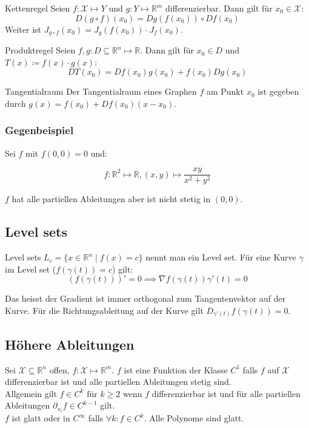 \documentclass[a4paper,10pt]{article}
\def\R{\mathbb{R}}
\def\X{\mathcal{X}}
\begin{document}
\begin{subbox}{Kettenregel}
  Seien $f: \mathcal{X} \mapsto Y$ und $g: Y \mapsto \R^m$ differenzierbar. Dann gilt für $x_0 \in \mathcal{X}$:
  $$D(g \circ f)(x_0) = Dg(f(x_0)) \circ Df(x_0)$$
  Weiter ist \(J_{g \circ f}(x_0) = J_g(f(x_0)) \cdot J_f(x_0)\).
\end{subbox}

\begin{subbox}{Produktregel}
  Seien $f, g: D \subseteq \R^n \mapsto \R$. Dann gilt für $x_0 \in D$ und $T(x) \coloneqq f(x) \cdot g(x)$:
  $$DT(x_0) = Df(x_0) g(x_0) + f(x_0) Dg(x_0)$$
\end{subbox}

\begin{subbox}{Tangentialraum}
  Der Tangentialraum eines Graphen \(f\) am Punkt \(x_0\) ist gegeben durch \(g(x) = f(x_0) + Df(x_0)(x-x_0)\).
\end{subbox}

\subsubsection*{Gegenbeispiel}

Sei $f$ mit $f(0, 0) = 0$ und:

$$f: \R^2 \mapsto \R, (x, y) \mapsto \frac{xy}{x^2 + y^2}$$

$f$ hat alle partiellen Ableitungen aber ist nicht stetig in $(0, 0)$.

\subsection{Level sets}

\begin{mainbox}{Level sets}
  $L_c = \{ x \in \mathbb{R}^n \mid f(x) = c \}$ nennt man ein Level set.
  Für eine Kurve $\gamma$ im Level set ($f(\gamma(t)) = c$) gilt:
  $$(f(\gamma(t)))' = 0 \implies \nabla f(\gamma(t)) \gamma'(t) = 0$$
\end{mainbox}

Das heisst der Gradient ist immer orthogonal zum Tangentenvektor auf der Kurve. Für die Richtungsableitung auf der Kurve gilt $D_{\gamma'(t)}f(\gamma(t)) = 0$.

\subsection{Höhere Ableitungen}
Sei \(\X \subseteq \R^n\) offen, \(f: \X \mapsto \R^m\). \(f\) ist eine Funktion der Klasse \(C^1\) falls \(f\) auf \(\X\) differenzierbar ist und alle partiellen Ableitungen stetig sind. \\
Allgemein gilt \(f \in C^k\) für \(k \ge 2\) wenn \(f\) differenzierbar ist und für alle partiellen Ableitungen \(\partial_{x_i} f \in C^{k-1}\) gilt. \\
\(f\) ist glatt oder in \(C^\infty\) falls \(\forall k: f \in C^k \). Alle Polynome sind glatt.
\end{document}
